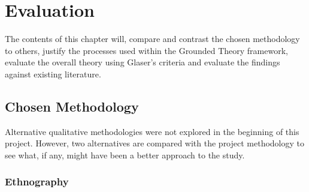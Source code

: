 \chapter{Evaluation}\label{C:Evaluation}

\par The contents of this chapter will, compare and contrast the chosen methodology to others, justify the processes used within the Grounded Theory framework, evaluate the overall theory using Glaser's criteria and evaluate the findings against existing literature.

\section{Chosen Methodology}

Alternative qualitative methodologies were not explored in the beginning of this project. However, two alternatives are compared with the project methodology to see what, if any, might have been a better approach to the study. 

\subsection{Ethnography}

